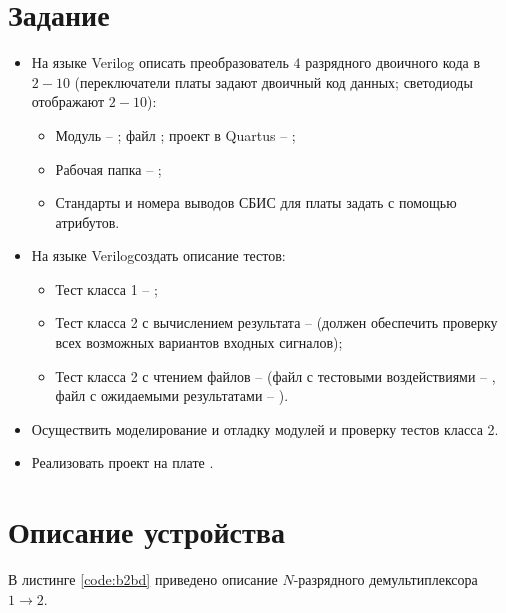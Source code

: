 





\tableofcontents
\lstlistoflistings
\listoffigures
\newpage

\section{Задание}

\begin{itemize}
	\item На языке Verilog описать преобразователь $4$ разрядного двоичного кода в $2-10$ (переключатели платы  задают двоичный код данных; светодиоды отображают $2-10$):
		\begin{itemize}
			\item Модуль -- ; файл ; проект в Quartus -- ;
			\item Рабочая папка -- ;
			\item Стандарты и номера выводов СБИС для платы  задать с помощью атрибутов.
		\end{itemize}
	
	\item На языке Verilogсоздать описание тестов:
		\begin{itemize}
			\item Тест класса 1 -- ;
			\item Тест класса 2 с вычислением результата --  (должен обеспечить проверку всех возможных вариантов входных сигналов);
			\item Тест класса 2 с чтением файлов --  (файл с тестовыми воздействиями -- , файл с ожидаемыми результатами -- ).
		\end{itemize}
	
	\item Осуществить моделирование и отладку модулей и проверку тестов класса 2.
	
	\item Реализовать проект на плате .
\end{itemize}

\section{Описание устройства}

\noindent В листинге \ref{code:b2bd} приведено описание $N$-разрядного демультиплексора $1 \rightarrow 2$.


